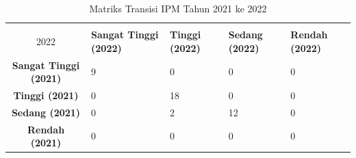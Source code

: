 \begin{table}[H]
\centering
\caption{Matriks Transisi IPM Tahun 2021 ke 2022} \label{tab:ipm_transisi_2021_2022}
\begin{tabular}{|c|p{2cm}|p{2cm}|p{2cm}|p{2cm}|}
\hline
\textbf{Tahun 2021 \\ 2022} & \textbf{Sangat Tinggi (2022)} & \textbf{Tinggi (2022)} & \textbf{Sedang (2022)} & \textbf{Rendah (2022)} \\ \hline
\textbf{Sangat Tinggi (2021)} & 9 & 0 & 0 & 0 \\ \hline
\textbf{Tinggi (2021)} & 0 & 18 & 0 & 0 \\ \hline
\textbf{Sedang (2021)} & 0 & 2 & 12 & 0 \\ \hline
\textbf{Rendah (2021)} & 0 & 0 & 0 & 0 \\ \hline
\end{tabular}
\end{table}
